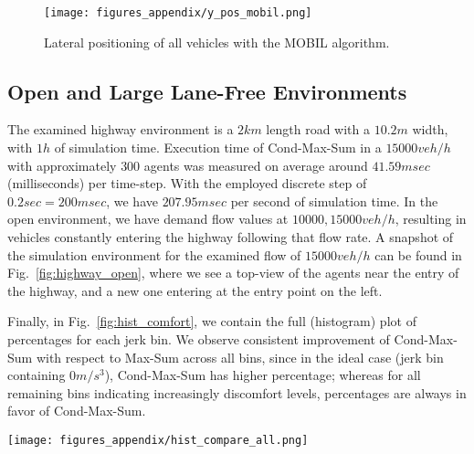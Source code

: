 \begin{figure}
    \centering
    \texttt{[image: figures\_appendix/y\_pos\_mobil.png]}
    \caption{Lateral positioning of all vehicles with the MOBIL algorithm.}
    \label{fig:pos_y_mobil}
\end{figure}

\subsection{Open and Large Lane-Free Environments}

The examined highway environment is a $2km$ length road with a $10.2m$ width, with $1h$ of simulation time.
Execution time of Cond-Max-Sum in a $15000 veh/h$ with approximately $300$ agents was measured on average around $41.59 msec$ (milliseconds) per time-step.
With the employed discrete step of $0.2 sec=200 msec$, we have $207.95msec$ per second of simulation time.
In the open environment, we have demand flow values at $10000, 15000 veh/h$, resulting in vehicles constantly entering the highway following that flow rate.
A snapshot of the simulation environment for the examined flow of $15000 veh/h$ can be found in Fig.~\ref{fig:highway_open}, where we see a top-view of the agents near the entry of the highway, and a new one entering at the entry point on the left.

Finally, in Fig.~\ref{fig:hist_comfort}, we contain the full (histogram) plot of percentages for each jerk bin.
We observe consistent improvement of Cond-Max-Sum with respect to Max-Sum across all bins, since in the ideal case (jerk bin containing $0 m/s^3$), Cond-Max-Sum has higher percentage; whereas for all remaining bins indicating increasingly discomfort levels,  percentages are always in favor of Cond-Max-Sum.


\begin{figure*}
    \centering
    \texttt{[image: figures\_appendix/hist\_compare\_all.png]}
    \caption{Lateral jerk percentage (histogram) plot for Cond-Max-Sum, Max-Sum and No-Max-Sum in $15000veh/h$.}
    \label{fig:hist_comfort}
    \Description{}
\end{figure*}





